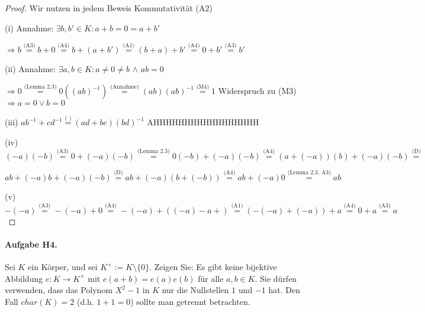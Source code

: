 \documentclass[12pt, letterpaper]{article}
\begin{document}
\begin{proof} Wir nutzen in jedem Beweis Kommutativität (A2)
    \hspace*{10mm} \par
    (i) Annahme: $\exists b,b' \in K : a+b=0=a+b'$ 
        \par
        $\Rightarrow b \overset{\text{(A3)}}{=} b + 0 \overset{\text{(A4)}}{=} b + (a + b') \overset{\text{(A1)}}{=} 
        (b + a) + b' \overset{\text{(A4)}}{=} 0 + b' \overset{\text{(A3)}}{=} b' $
    \par
    (ii) Annahme: $\exists a,b \in K : a \neq 0 \neq b$ $\land$ $ab=0$ 
        \par
        $\Rightarrow 0 \overset{\text{(Lemma 2.3)}}{=} 0((ab)^{-1}) \overset{\text{(Annahme)}}{=} 
        (ab)(ab)^{-1} \overset{\text{(M4)}}{=} 1$ Widerspruch zu (M3) $\Rightarrow a=0 \lor b = 0$
    \par
    (iii) $ab^{-1}+cd^{-1} \overset{\text{( )}}{=} (ad + bc)(bd)^{-1}$ AHHHHHHHHHHHHHHHHH
        \par
    (iv) $(-a)(-b) \overset{\text{(A3)}}{=} 0 + (-a)(-b) \overset{\text{(Lemma 2.3)}}{=} 0(-b)+(-a)(-b) \overset{\text{(A4)}}{=}
        (a+(-a))(b)+(-a)(-b) \overset{\text{(D)}}{=}$ \par \hspace*{7mm}   $ab +(-a)b+(-a)(-b) \overset{\text{(D)}}{=} 
        ab+(-a)(b+(-b)) \overset{\text{(A4)}}{=} ab+(-a)0 \overset{\text{(Lemma 2.3, A3)}}{=} ab$ 
    \par
    (v) $-(-a) \overset{\text{(A3)}}{=} -(-a) + 0 \overset{\text{(A4)}}{=} -(-a) + ((-a)-a+) 
        \overset{\text{(A1)}}{=} (-(-a)+(-a))+a \overset{\text{(A4)}}{=} 0 + a \overset{\text{(A3)}}{=} a$
    \par
\end{proof}


\paragraph{Aufgabe H4.}

Sei $K$ ein Körper, und sei $K^\times  := K \setminus  \{0\}$. Zeigen Sie: Es gibt keine
bijektive Abbildung $e : K \to K^\times$ mit $e(a + b) = e(a)e(b)$ für alle $a, b \in  K$. Sie
dürfen verwenden, dass das Polynom $X^2 - 1$ in $K$ nur die Nullstellen $1$ und $-1$ hat.
Den Fall $char(K) = 2$  (d.h. $1 + 1 = 0$) sollte man getrennt betrachten.
\end{document}
